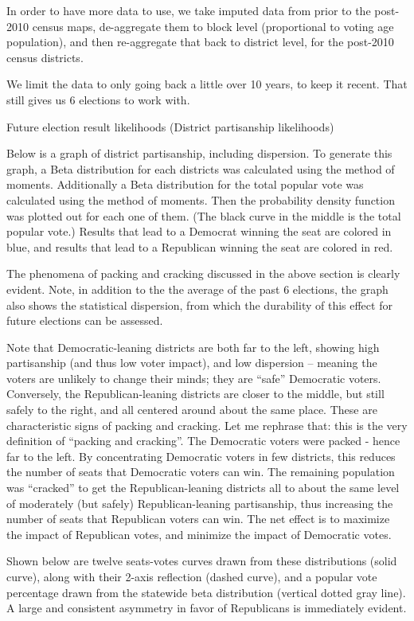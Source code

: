 \documentclass[preprint,12pt]{article}
\begin{document}
In order to have more data to use, we take imputed data from prior to the post-2010 census maps, de-aggregate them to block level (proportional to voting age population), and then re-aggregate that back to district level, for the post-2010 census districts.
 
We limit the data to only going back a little over 10 years, to keep it recent.  That still gives us 6 elections to work with.
 
Future election result likelihoods (District partisanship likelihoods)
 
Below is a graph of district partisanship, including dispersion.  To generate this graph, a Beta distribution for each districts was calculated using the method of moments.  Additionally a Beta distribution for the total popular vote was calculated using the method of moments.  Then the probability density function was plotted out for each one of them.  (The black curve in the middle is the total popular vote.) Results that lead to a Democrat winning the seat are colored in blue, and results that lead to a Republican winning the seat are colored in red.
 
The phenomena of packing and cracking discussed in the above section is clearly evident.  Note, in addition to the the average of the past 6 elections, the graph also shows the statistical dispersion, from which the durability of this effect for future elections can be assessed.

 
Note that Democratic-leaning districts are both far to the left, showing high partisanship (and thus low voter impact), and low dispersion -- meaning the voters are unlikely to change their minds; they are “safe” Democratic voters.  Conversely, the Republican-leaning districts are closer to the middle, but still safely to the right, and all centered around about the same place.   These are characteristic signs of packing and cracking.  Let me rephrase that: this is the very definition of “packing and cracking”.  The Democratic voters were packed - hence far to the left.  By concentrating Democratic voters in few districts, this reduces the number of seats that Democratic voters can win.  The remaining population was “cracked” to get the Republican-leaning districts all to about the same level of moderately (but safely) Republican-leaning partisanship, thus increasing the number of seats that Republican voters can win.  The net effect is to maximize the impact of Republican votes, and minimize the impact of Democratic votes.
 
Shown below are twelve seats-votes curves drawn from these distributions (solid curve), along with their 2-axis reflection (dashed curve), and a popular vote percentage drawn from the statewide beta distribution (vertical dotted gray line).  A large and consistent asymmetry in favor of Republicans is immediately evident.
 
\end{document}
